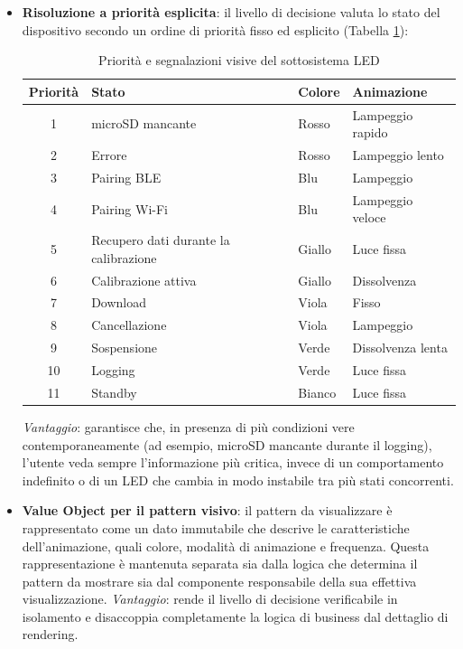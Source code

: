 \begin{itemize}
    \item \textbf{Risoluzione a priorità esplicita}: il livello di decisione valuta lo stato del dispositivo
    secondo un ordine di priorità fisso ed esplicito (Tabella \ref{tab:led-priorita}):
    \begin{table}[H]
        \centering
        \begin{tabular}{c l l l}
            \hline
            \textbf{Priorità} & \textbf{Stato} & \textbf{Colore} & \textbf{Animazione} \\
            \hline
            1 & microSD mancante & Rosso & Lampeggio rapido \\
            2 & Errore & Rosso & Lampeggio lento \\
            3 & Pairing BLE & Blu & Lampeggio \\
            4 & Pairing Wi-Fi & Blu & Lampeggio veloce \\
            5 & Recupero dati durante la calibrazione & Giallo & Luce fissa \\
            6 & Calibrazione attiva & Giallo & Dissolvenza \\
            7 & Download & Viola & Fisso \\
            8 & Cancellazione & Viola & Lampeggio \\
            9 & Sospensione & Verde & Dissolvenza lenta \\
            10 & Logging & Verde & Luce fissa \\
            11 & Standby & Bianco & Luce fissa \\
            \hline
        \end{tabular}
        \caption{Priorità e segnalazioni visive del sottosistema LED}
        \label{tab:led-priorita}
    \end{table}
    \textit{Vantaggio}: garantisce che, in presenza di più condizioni vere contemporaneamente (ad esempio, microSD mancante durante il logging), l'utente 
    veda sempre l'informazione più critica, invece di un comportamento indefinito o di un LED che cambia in modo instabile tra più stati concorrenti.
    \item \textbf{Value Object per il pattern visivo}: il pattern da visualizzare è rappresentato come un dato immutabile che descrive le caratteristiche 
    dell'animazione, quali colore, modalità di animazione e frequenza. Questa rappresentazione è mantenuta separata sia dalla logica che determina il pattern 
    da mostrare sia dal componente responsabile della sua effettiva visualizzazione.
    \textit{Vantaggio}: rende il livello di decisione verificabile in isolamento e disaccoppia completamente la logica di business dal dettaglio di rendering.
\end{itemize}

